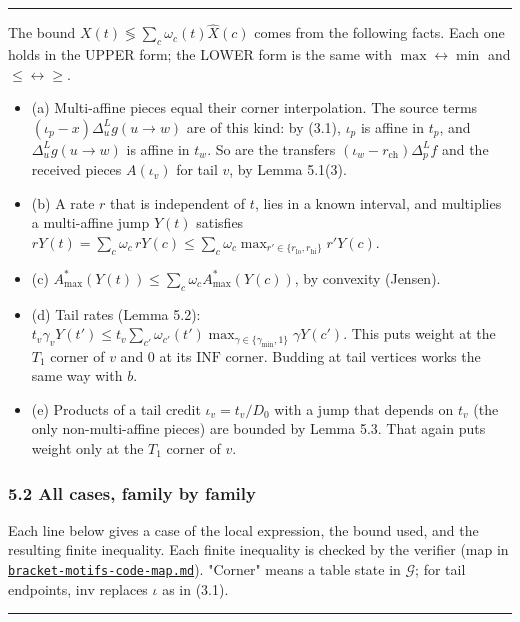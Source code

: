 \documentclass[11pt]{article}
\newcommand{\proofsrc}[2]{\href{https://github.com/uzay-eth/friend-tree-exponent/blob/a0972085ad72ad5685ae7b424988648d1965e73c/#1}{#2}}
\theoremstyle{remark}
\numberwithin{equation}{section}
\newenvironment{transcription}{\par\medskip\noindent\rule{\linewidth}{0.4pt}\par\nopagebreak}{\par\nopagebreak\noindent\rule{\linewidth}{0.4pt}\par\medskip}
\begin{document}
\begin{transcription}
The bound $X(t) \lessgtr \sum_c \omega_c(t)\widehat X(c)$ comes from the following facts. Each one holds in the UPPER form; the LOWER form is the same with $\max \leftrightarrow \min$ and $\le \leftrightarrow \ge$.
\begin{itemize}
\item (a) Multi-affine pieces equal their corner interpolation. The source terms $(\iota_p - x)\Delta^L_u g(u \to w)$ are of this kind: by (3.1), $\iota_p$ is affine in $t_p$, and $\Delta^L_u g(u \to w)$ is affine in $t_w$. So are the transfers $(\iota_w - r_{\mathrm{ch}})\Delta^L_p f$ and the received pieces $A(\iota_v)$ for tail $v$, by Lemma 5.1(3).
\item (b) A rate $r$ that is independent of $t$, lies in a known interval, and multiplies a multi-affine jump $Y(t)$ satisfies $rY(t) = \sum_c \omega_c\,rY(c) \le \sum_c \omega_c \max_{r' \in \{r_{\mathrm{lo}}, r_{\mathrm{hi}}\}} r'Y(c)$.
\item (c) $A^*_{\max}(Y(t)) \le \sum_c \omega_c A^*_{\max}(Y(c))$, by convexity (Jensen).
\item (d) Tail rates (Lemma 5.2): $t_v\gamma_v Y(t') \le t_v\sum_{c'}\omega_{c'}(t')\max_{\gamma \in \{\gamma_{\min}, 1\}}\gamma Y(c')$. This puts weight at the $T_1$ corner of $v$ and $0$ at its $\mathrm{INF}$ corner. Budding at tail vertices works the same way with $b$.
\item (e) Products of a tail credit $\iota_v = t_v/D_0$ with a jump that depends on $t_v$ (the only non-multi-affine pieces) are bounded by Lemma 5.3. That again puts weight only at the $T_1$ corner of $v$.
\end{itemize}

\subsubsection*{5.2 All cases, family by family}
Each line below gives a case of the local expression, the bound used, and the resulting finite inequality. Each finite inequality is checked by the verifier (map in \proofsrc{proofs/bracket-motifs-code-map.md}{\texttt{bracket-motifs-code-map.md}}). "Corner" means a table state in $\mathcal{G}$; for tail endpoints, $\mathrm{inv}$ replaces $\iota$ as in (3.1).


\end{transcription}
\end{document}
